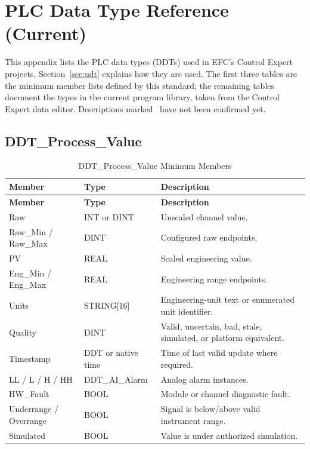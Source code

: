 \chapter{PLC Data Type Reference (Current)}
\label{app:data-types}
This appendix lists the PLC data types (DDTs) used in EFC's Control Expert projects. Section~\ref{sec:udt} explains how they are used. The first three tables are the minimum member lists defined by this standard; the remaining tables document the types in the current program library, taken from the Control Expert data editor. Descriptions marked \tbd\ have not been confirmed yet.


\section{DDT\_Process\_Value}
\begin{longtable}{@{}P{3.90cm}P{3.90cm}P{9.10cm}@{}}
\caption{DDT\_Process\_Value Minimum Members}\label{tab:ddt-process-value}\\
\toprule {}\textbf{Member} & \textbf{Type} & \textbf{Description}\\ \midrule
\endfirsthead
\toprule {}\textbf{Member} & \textbf{Type} & \textbf{Description}\\ \midrule
\endhead
Raw & INT or DINT & Unscaled channel value.\\
Raw\_Min / Raw\_Max & DINT & Configured raw endpoints.\\
PV & REAL & Scaled engineering value.\\
Eng\_Min / Eng\_Max & REAL & Engineering range endpoints.\\
Units & STRING[16] & Engineering-unit text or enumerated unit identifier.\\
Quality & DINT & Valid, uncertain, bad, stale, simulated, or platform equivalent.\\
Timestamp & DDT or native time & Time of last valid update where required.\\
LL / L / H / HH & DDT\_AI\_Alarm & Analog alarm instances.\\
HW\_Fault & BOOL & Module or channel diagnostic fault.\\
Underrange / Overrange & BOOL & Signal is below/above valid instrument range.\\
Simulated & BOOL & Value is under authorized simulation.\\
\bottomrule
\end{longtable}


